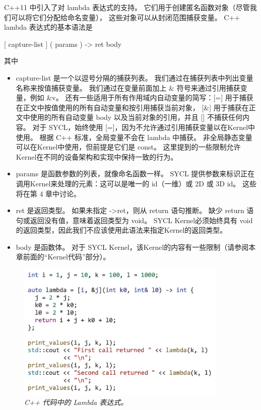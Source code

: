 C++11 中引入了对 lambda 表达式的支持。 它们用于创建匿名函数对象（尽管我们可以将它们分配给命名变量），
这些对象可以从封闭范围捕获变量。 C++ lambda 表达式的基本语法是

[ capture-list ] ( params ) -> ret { body }


其中

\begin{itemize}
	\item capture-list 是一个以逗号分隔的捕获列表。 我们通过在捕获列表中列出变量名称来按值捕获变量。 
	我们通过在变量前面加上 \& 符号来通过引用捕获变量，例如 \&v。 
	还有一些适用于所有作用域内自动变量的简写：[=] 用于捕获在正文中按值使用的所有自动变量和按引用捕获当前对象，
	[\&] 用于捕获在正文中使用的所有自动变量 body 以及当前对象的引用，并且 [] 不捕获任何内容。 
	对于 SYCL，始终使用 [=]，因为不允许通过引用捕获变量以在Kernel中使用。 
	根据 C++ 标准，全局变量不会在 lambda 中捕获。 
	非全局静态变量可以在Kernel中使用，但前提是它们是 const。 
	这里提到的一些限制允许Kernel在不同的设备架构和实现中保持一致的行为。

	\item params 是函数参数的列表，就像命名函数一样。 
	SYCL 提供参数来标识正在调用Kernel来处理的元素：这可以是唯一的 id（一维）或 2D 或 3D id。 
	这些将在第 4 章中讨论。

	\item ret 是返回类型。 如果未指定 ->ret，则从 return 语句推断。
	缺少 return 语句或返回没有值，意味着返回类型为 void。 
	SYCL Kernel必须始终具有 void 的返回类型，因此我们不应该使用此语法来指定Kernel的返回类型。

	\item body 是函数体。 对于 SYCL Kernel，该Kernel的内容有一些限制（请参阅本章前面的“Kernel代码”部分）。
\end{itemize}

\begin{figure}[H]
	\centering
	\includegraphics[width=0.9\textwidth]{figs/F1.4.png}
	\caption{\textit{C++ 代码中的 Lambda 表达式。}}
\end{figure}

